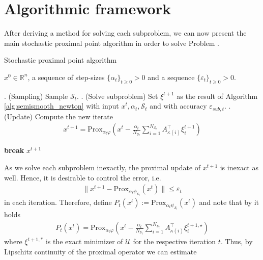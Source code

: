 \documentclass[12pt,a4paper,twoside]{article}
\makeatletter
\renewcommand*{\eqref}[1]{%
	\hyperref[{#1}]{\textup{\tagform@{\ref*{#1}}}}%
}
\theoremstyle{plain}
\theoremstyle{note}
\numberwithin{thm}{section}
\newcommand{\prox}[2]{\text{Prox}_{#1}\left(#2\right)}
\newcommand{\ixmap}[1]{{\kappa(#1)}}
\let\temp\phi
\let\phi\varphi
\let\varphi\temp
\let\epsilon\varepsilon
\makeatother
\begin{document}
\section{Algorithmic framework}
	After deriving a method for solving each subproblem, we can now present the main stochastic proximal point algorithm in order to solve Problem \eqref{prob:deterministic}.
	\vspace{5mm}
	\begin{algorithm}[H]
		\caption{Stochastic proximal point algorithm}
		\label{alg:stochastic_ssnal}
	\begin{algorithmic}
		\REQUIRE $x^0 \in \mathbb{R}^n$, a sequence of step-sizes $\{\alpha_t\}_{t\geq 0} > 0$ and a sequence $\{\epsilon_t\}_{t\geq 0} > 0$.
	
	
		. (Sampling) Sample $\mathcal{S}_t$.
		. (Solve subproblem) Set $\xi^{t+1}$ as the result of Algorithm \ref{alg:semismooth_newton} with input $x^t, \alpha_t, \mathcal{S}_t$ and with accuracy $\epsilon_{sub,t}$.
		. (Update) Compute the new iterate 
		\begin{align*}
		x^{t+1} = \prox{\alpha_t \phi}{x^t - \frac{\alpha_t}{N_{\mathcal{S}_t}} \sum_{i =1}^{N_{\mathcal{S}_t}} A_\ixmap{i}^\intercal \xi_i^{t+1}}
		\end{align*}
		
		\STATE \textbf{break}
		\ENDIF
		\ENDFOR	
		\RETURN $x^{t+1}$
	\end{algorithmic}
	\end{algorithm}
	\vspace{5mm}
	
	As we solve each subproblem inexactly, the proximal update of $x^{t+1}$ is inexact as well. Hence, it is desirable to control the error, i.e.
	\begin{align*}
		\|x^{t+1} - \prox{\alpha_t \psi_{\mathcal{S}_t}}{x^t}\| \leq \epsilon_t
	\end{align*}
	in each iteration.
	Therefore, define $P_t(x^t) := \prox{\alpha_t \psi_{\mathcal{S}_t}}{x^t}$ and note that by \eqref{eqn:nonlinear_system_stochastic} it holds
	\begin{align*}
		P_t(x^t) = \prox{\alpha_t \phi}{x^t - \frac{\alpha_t}{N_{\mathcal{S}_t}} \sum_{i =1}^{N_{\mathcal{S}_t}} A_\ixmap{i}^\intercal \xi_i^{t+1, \star}}
	\end{align*}
	where $\xi^{t+1, \ast}$ is the exact minimizer of $\mathcal{U}$ for the respective iteration $t$. Thus, by Lipschitz continuity of the proximal operator we can estimate
	
\end{document}
